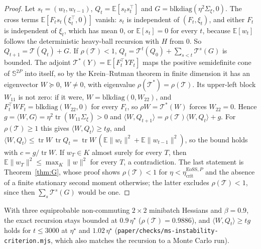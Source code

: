 \documentclass[11pt]{article}
\theoremstyle{remark}
\newcommand{\etacrit}{\eta_{\mathrm{crit}}}
\newcommand{\E}{\mathbb{E}}
\newcommand{\tr}{\operatorname{tr}}
\begin{document}
\begin{proof}
Let $s_t=(w_t,w_{t-1})$, $Q_t=\E[s_ts_t^\top]$ and $G=\mathrm{blkdiag}(\eta^2\Sigma_\xi,0)$. The cross terms $\E[F_ts_t(\xi_t^\top,0)]$ vanish: $s_t$ is independent of $(F_t,\xi_t)$, and either $F_t$ is independent of $\xi_t$, which has mean $0$, or $\E[s_t]=0$ for every $t$, because $\E[w_t]$ follows the deterministic heavy-ball recursion with $H$ from $0$. So $Q_{t+1}=\mathcal T(Q_t)+G$. If $\rho(\mathcal T)<1$, $Q_t=\mathcal T^t(Q_0)+\sum_{s<t}\mathcal T^s(G)$ is bounded. The adjoint $\mathcal T^*(Y)=\E[F_t^\top YF_t]$ maps the positive semidefinite cone of $\mathbb S^{2P}$ into itself, so by the Krein--Rutman theorem in finite dimension \citep[Thm.~1.3.2]{berman1994} it has an eigenvector $W\succeq0$, $W\ne0$, with eigenvalue $\rho(\mathcal T^*)=\rho(\mathcal T)$. Its upper-left block $W_{11}$ is not zero: if it were, $W=\mathrm{blkdiag}(0,W_{22})$, and $F_t^\top WF_t=\mathrm{blkdiag}(W_{22},0)$ for every $F_t$, so $\rho W=\mathcal T^*(W)$ forces $W_{22}=0$. Hence $g=\langle W,G\rangle=\eta^2\tr(W_{11}\Sigma_\xi)>0$ and $\langle W,Q_{t+1}\rangle=\rho(\mathcal T)\langle W,Q_t\rangle+g$. For $\rho(\mathcal T)\ge1$ this gives $\langle W,Q_t\rangle\ge tg$, and $\langle W,Q_t\rangle\le\tr W\,\tr Q_t=\tr W\,(\E\|w_t\|^2+\E\|w_{t-1}\|^2)$, so the bound holds with $c=g/\tr W$. If $w_T\in K$ almost surely for every $T$, then $\E\|w_T\|^2\le\max_K\|w\|^2$ for every $T$, a contradiction. The last statement is Theorem~\ref{thm:G}, whose proof shows $\rho(\mathcal T)<1$ for $\eta<\etacrit^{\mathrm{EoSS},P}$ and the absence of a finite stationary second moment otherwise; the latter excludes $\rho(\mathcal T)<1$, since then $\sum_s\mathcal T^s(G)$ would be one.
\end{proof}
With three equiprobable non-commuting $2\times2$ minibatch Hessians and $\beta=0.9$, the exact recursion stays bounded at $0.9\,\eta^\star$ ($\rho(\mathcal T)=0.9886$), and $\langle W,Q_t\rangle\ge tg$ holds for $t\le3000$ at $\eta^\star$ and $1.02\,\eta^\star$ (\texttt{paper/checks/ms-instability-criterion.mjs}, which also matches the recursion to a Monte Carlo run).
\end{document}

